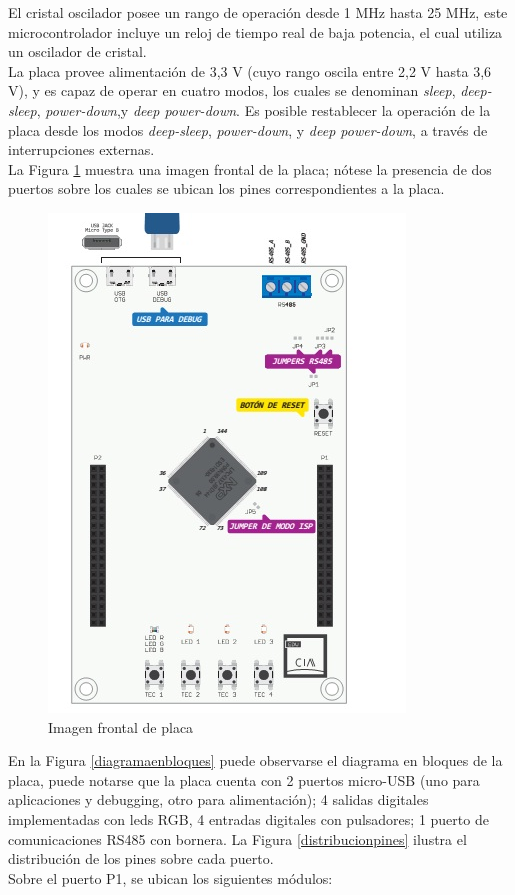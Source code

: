 \documentclass[12pt,letterpaper]{article}
\begin{document}
El cristal oscilador posee un rango de operación desde 1 MHz hasta 25 MHz, este microcontrolador incluye un reloj de tiempo real de baja potencia, el cual utiliza un oscilador de cristal.
  \\

La placa provee alimentación de 3,3 V (cuyo rango oscila entre 2,2 V hasta 3,6 V), y es capaz de operar en cuatro modos, los cuales se denominan \textit{sleep}, \textit{deep-sleep}, \textit{power-down},y \textit{deep power-down}. Es posible restablecer la operación de la placa desde los modos \textit{deep-sleep}, \textit{power-down}, y \textit{deep power-down}, a través de interrupciones externas.
 \\
 
La Figura  \ref{Fig2} muestra  una imagen frontal de la placa; nótese la presencia de dos puertos sobre los cuales se ubican los pines correspondientes a la placa.

\begin{figure}[H]
\centering
\includegraphics[width=6 cm]{figuras/FIGURA_1.jpg}
\caption{Imagen frontal de placa}
\label{Fig2}
\end{figure}
 
En la Figura  \ref{diagramaenbloques} puede observarse el diagrama en bloques de la placa\cite{diagramaenbloquesdeplaca}, puede notarse que la placa cuenta con 2 puertos micro-USB (uno para aplicaciones y debugging, otro para alimentación); 4 salidas digitales implementadas con leds RGB, 4 entradas digitales con pulsadores; 1 puerto de comunicaciones RS485 con bornera. La Figura  \ref{distribucionpines} ilustra el distribución de los pines sobre cada puerto.
 \\
 
Sobre el puerto P1, se ubican los siguientes módulos:
\end{document}
